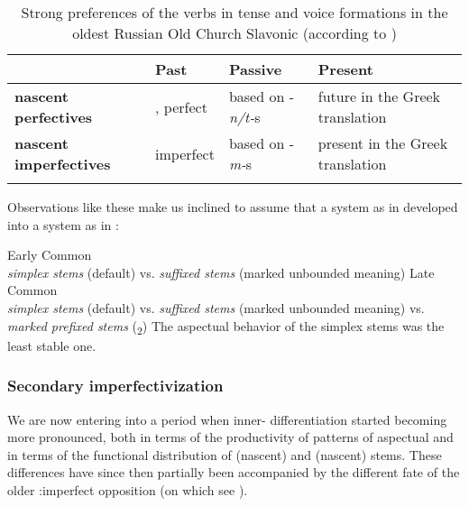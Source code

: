 \documentclass[output=paper]{langsci/langscibook}
\begin{document}
\begin{table}
\caption{Strong preferences of the verbs in tense and voice formations in the oldest Russian Old Church Slavonic (according to \citealt{Seržant2009})}
\label{tab:wiemerserzant:5}
\begin{tabularx}{\textwidth}{QlQQ}
\lsptoprule
 & Past  & Passive & Present \\
\midrule 
\textbf{nascent perfectives} & , perfect & based on -\textit{n/t-}s & future in the Greek translation\\
\textbf{nascent imperfectives} & imperfect & based on -\textit{m-}s & present in the Greek translation\\
\lspbottomrule
\end{tabularx}
\end{table}
Observations like these make us inclined to assume that a system as in  developed into a system as in :

\ea%
    \label{ex:wiemer:8}     
    Early Common \\
\textit{simplex stems} (default) vs. \textit{suffixed stems} (marked unbounded meaning)
\z
\newpage
\ea%
    \label{ex:wiemer:9}    
      Late Common \\
\textit{simplex stems} (default) vs. \textit{suffixed stems} (marked unbounded meaning) 
vs. \textit{marked prefixed stems} (\textsubscript{2})
\z
\noindent
The aspectual behavior of the simplex stems was the least stable one.

\subsubsection{Secondary imperfectivization}\label{sec:wiemerserzant:3.2.3}

We are now entering into a period when inner- differentiation started becoming more pronounced, both in terms of the productivity of patterns of aspectual  and in terms of the functional distribution of (nascent)  and (nascent)  stems. These differences have since then partially been accompanied by the different fate of the older :imperfect opposition (on which see ).
\end{document}
